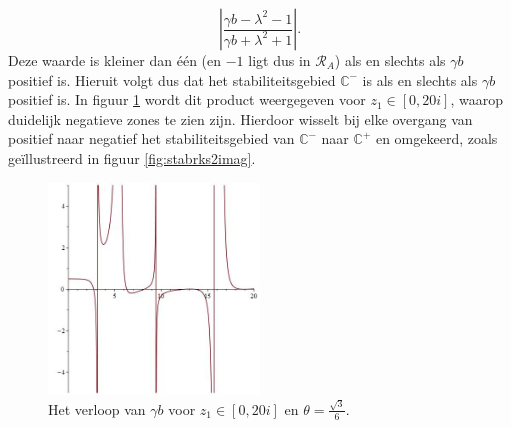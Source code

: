 \documentclass[12pt]{article}
\begin{document}
\[\left|\frac{\gamma b-\lambda^2-1}{\gamma b+\lambda^2+1}\right|.\]
Deze waarde is kleiner dan één (en \(-1\) ligt dus in \(\mathcal{R}_A\)) als en slechts als \(\gamma b\) positief is. Hieruit volgt dus dat het stabiliteitsgebied \(\mathbb{C}^-\) is als en slechts als \(\gamma b\) positief is. In figuur \ref{fig:stabrks2gb} wordt dit product weergegeven voor \(z_1\in[0,20i]\), waarop duidelijk negatieve zones te zien zijn. Hierdoor wisselt bij elke overgang van positief naar negatief het stabiliteitsgebied van \(\mathbb{C}^-\) naar \(\mathbb{C}^+\) en omgekeerd, zoals geïllustreerd in figuur \ref{fig:stabrks2imag}. 
\begin{figure}[H]
    \centering
    \includegraphics[width=0.5\textwidth]{stabrks2gb.jpg}
    \caption{Het verloop van \(\gamma b\) voor \(z_1\in[0,20i]\) en \(\theta=\frac{\sqrt{3}}{6}\).}
    \label{fig:stabrks2gb}
\end{figure}
\end{document}
